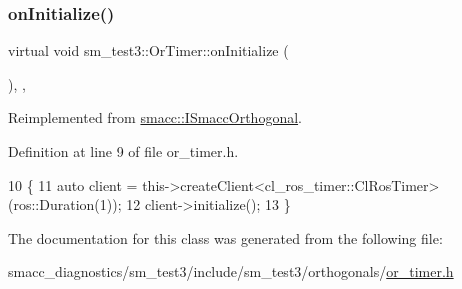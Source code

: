 \subsubsection{\texorpdfstring{on\+Initialize()}{onInitialize()}}
{\footnotesize\ttfamily virtual void sm\+\_\+test3\+::\+Or\+Timer\+::on\+Initialize (\begin{DoxyParamCaption}{ }\end{DoxyParamCaption})\hspace{0.3cm}{\ttfamily [inline]}, {\ttfamily [override]}, {\ttfamily [virtual]}}



Reimplemented from \hyperlink{classsmacc_1_1ISmaccOrthogonal_a6bb31c620cb64dd7b8417f8705c79c7a}{smacc\+::\+I\+Smacc\+Orthogonal}.



Definition at line 9 of file or\+\_\+timer.\+h.


\begin{DoxyCode}
10     \{
11         \textcolor{keyword}{auto} client = this->createClient<cl\_ros\_timer::ClRosTimer>(ros::Duration(1));
12         client->initialize();
13     \}
\end{DoxyCode}


The documentation for this class was generated from the following file\+:\begin{DoxyCompactItemize}
\item 
smacc\+\_\+diagnostics/sm\+\_\+test3/include/sm\+\_\+test3/orthogonals/\hyperlink{smacc__diagnostics_2sm__test3_2include_2sm__test3_2orthogonals_2or__timer_8h}{or\+\_\+timer.\+h}\end{DoxyCompactItemize}
